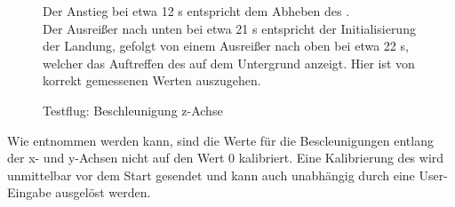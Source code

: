 \begin{figure}[ht!]
\vspace{0.25cm}
\begin{center}
\caption{Testflug: Beschleunigung z-Achse}
\label{fig:Flightaz}
\end{center}

\vspace{0.25cm}
Der Anstieg bei etwa 12 s entspricht dem Abheben des \Quad[s].\\
Der Ausreißer nach unten bei etwa 21 s entspricht der Initialisierung der Landung, gefolgt von einem Ausreißer nach oben bei etwa 22 s, welcher das Auftreffen des \Quad[s] auf dem Untergrund anzeigt. Hier ist von korrekt gemessenen Werten auszugehen.
\end{figure}












\FloatBarrier
{}









Wie  entnommen werden kann, sind die Werte für die Bescleunigungen entlang der x- und y-Achsen nicht auf den Wert 0 kalibriert. Eine Kalibrierung des \Quad[s] wird unmittelbar vor dem Start gesendet und kann auch unabhängig durch eine User-Eingabe ausgelöst werden.

